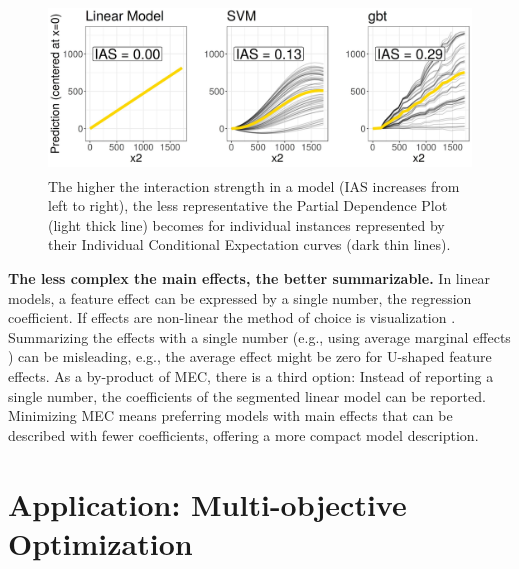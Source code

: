 \documentclass[runningheads]{llncs}\usepackage[]{graphicx}\usepackage[]{color}
\newenvironment{knitrout}{}{} %
\begin{document}
\begin{knitrout}\small
{}\color{fgcolor}\begin{figure}

{\centering \includegraphics[width=12cm,height=4.5cm]{knit-fig/pdp-unreliable-1} 

}

\caption[The higher the interaction strength in a model (IAS increases from left to right), the less representative the Partial Dependence Plot (light thick line) becomes for individual instances represented by their Individual Conditional Expectation curves (dark thin lines)]{The higher the interaction strength in a model (IAS increases from left to right), the less representative the Partial Dependence Plot (light thick line) becomes for individual instances represented by their Individual Conditional Expectation curves (dark thin lines).}\label{fig:pdp-unreliable}
\end{figure}


\end{knitrout}



\textbf{The less complex the main effects, the better summarizable.}
In linear models, a feature effect can be expressed by a single number, the regression coefficient.
If effects are non-linear the method of choice is visualization  \citep{apley2016visualizing,friedman2001greedy}.
Summarizing the effects with a single number (e.g., using average marginal effects \citep{leeper2017interpreting}) can be misleading, e.g., the average effect might be zero for U-shaped feature effects.
As a by-product of MEC, there is a third option: Instead of reporting a single number, the coefficients of the segmented linear model can be reported.
Minimizing MEC means preferring models with main effects that can be described with fewer coefficients, offering a more compact model description.





\section{Application: Multi-objective Optimization}
\label{sec:multiobj}
\end{document}
